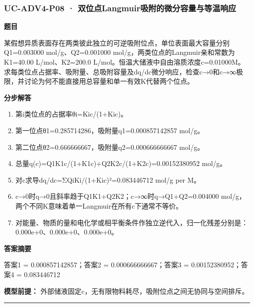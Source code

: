 \documentclass[UTF8,11pt,a4paper]{ctexart}
\begin{document}
\subsubsection*{UC-ADV4-P08 · 双位点Langmuir吸附的微分容量与等温响应}
\noindent\textbf{题目}\par
某假想异质表面存在两类彼此独立的可逆吸附位点，单位表面最大容量分别Q1=0.003000 mol/g、Q2=0.001000 mol/g，两类位点的Langmuir亲和常数为K1=40.00 L/mol、K2=200.0 L/mol。恒温大储液中自由溶质浓度c=0.01000M。求每类位点占据率、吸附量、总吸附容量及dq/dc微分响应，检查c→0和c→∞极限，并讨论为何不能直接用总容量和单一有效K代替两个位点。\par
\medskip\noindent\textbf{分步解答}
\begin{enumerate}
\item 第i类位点的占据率θi=Kic/(1+Kic)。
\item 第一位点θ1=0.285714286，吸附量q1=0.000857142857 mol/g。
\item 第二位点θ2=0.666666667，吸附量q2=0.000666666667 mol/g。
\item 总量q(c)=Q1K1c/(1+K1c)+Q2K2c/(1+K2c)=0.00152380952 mol/g。
\item 对c求导dq/dc=ΣQiKi/(1+Kic)²=0.083446712 mol/g per M。
\item c→0时q→0且斜率趋于Q1K1+Q2K2；c→∞时q→Q1+Q2=0.004000 mol/g，两个不同K意味着单一Langmuir在所有c下通常不等价。
\item 对能量、物质的量和电化学或相平衡条件作独立逆代入，归一化残差分别是：0.000e+0、0.000e+0、0.000e+0。
\end{enumerate}
\noindent\textbf{答案摘要}\par
答案1 = 0.000857142857；答案2 = 0.000666666667；答案3 = 0.00152380952；答案4 = 0.083446712\par
\noindent\textbf{模型前提：}
外部储液固定c，无有限物料耗尽，吸附位点之间无协同与空间排斥。\par
\medskip\hrule\medskip
{}
\end{document}
